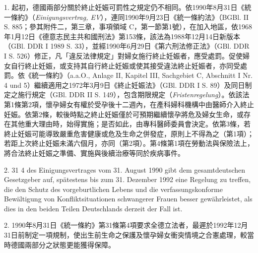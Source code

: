 \documentclass[12pt]{article}
\begin{document}
\begin{transpara}
1. 起初，德國兩部分關於終止妊娠可罰性之規定仍不相同。依1990年8月31日《統一條約》（\textit{Einigungsvertrag, EV}），連同1990年9月23日《統一條約法》（BGBl. II S. 885；參其附件二，第三章，事項領域 C，第一節第1號），在加入地區，依1968年1月12日《德意志民主共和國刑法》第153條，該法為1988年12月14日新版本（GBl. DDR I 1989 S. 33），並經1990年6月29日《第六刑法修正法》（GBl. DDR I S. 526）修正，凡「違反法律規定」對婦女施行終止妊娠者，應受處罰。促使婦女自行終止妊娠，或支持其自行終止妊娠或使其接受違法終止妊娠者，亦同受處罰。依《統一條約》（a.a.O., Anlage II, Kapitel III, Sachgebiet C, Abschnitt I Nr. 4 und 5）繼續適用之1972年3月9日《終止妊娠法》（GBl. DDR I S. 89）及同日制定之施行規定（GBl. DDR II S. 149），包含期限規定（\textit{Fristenregelung}）。依該法第1條第2項，懷孕婦女有權於受孕後十二週內，在產科婦科機構中由醫師介入終止妊娠。依第2條，較後時點之終止妊娠僅於可預期繼續懷孕將危及婦女生命，或存在其他重大理由時，始得實施；是否如此，由專科醫師委員會決定。依第3條，若終止妊娠可能導致嚴重危害健康或危及生命之併發症，原則上不得為之（第1項）；若距上次終止妊娠未滿六個月，亦同（第2項）。第4條第1項在勞動法與保險法上，將合法終止妊娠之準備、實施與後續治療等同於疾病事件。
\end{transpara}

\begin{sourcepara}[title={原文理由 A.II.2.a}]
2. \abbrArt{} 31 \abbrAbs{} 4 des Einigungsvertrages vom 31. August 1990 gibt dem gesamtdeutschen Gesetzgeber auf, spätestens bis zum 31. Dezember 1992 eine Regelung zu treffen, die den Schutz des vorgeburtlichen Lebens und die verfassungskonforme Bewältigung von Konfliktsituationen schwangerer Frauen besser gewährleistet, als dies in den beiden Teilen Deutschlands derzeit der Fall ist.
\end{sourcepara}
\begin{transpara}
2. 1990年8月31日《統一條約》第31條第4項要求全德立法者，最遲於1992年12月31日前制定一項規制，使出生前生命之保護及懷孕婦女衝突情境之合憲處理，較當時德國兩部分之狀態更能獲得保障。
\end{transpara}
\end{document}
